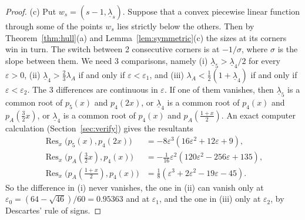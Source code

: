 \begin{proof}
(c) Put $w_s=(s-1,\underline\lambda_s)$. Suppose that a convex piecewise
linear function through some of the points $w_s$ lies strictly below the
others. Then by Theorem~\ref{thm:hull}(a) and Lemma~\ref{lem:symmetric}(c) the
sizes at its corners win in turn. The switch between 2 consecutive corners is
at $-1/\sigma$, where $\sigma$ is the slope between them. We need 3
comparisons, namely (i) $\underline\lambda_5>\underline\lambda_4/2$ for every
$\varepsilon>0$, (ii) $\underline\lambda_4>\frac23\lambda_A$ if and only if
$\varepsilon<\varepsilon_1$, and (iii)
$\lambda_A<\frac12(1+\underline\lambda_4)$ if and only if
$\varepsilon<\varepsilon_2$. The 3 differences are continuous in
$\varepsilon$. If one of them vanishes, then $\underline\lambda_5$ is a common
root of $p_5(x)$ and $p_4(2x)$, or $\underline\lambda_4$ is a common root of
$p_4(x)$ and $p_A(\frac32x)$, or $\underline\lambda_4$ is a common root of
$p_4(x)$ and $p_A(\frac{1+x}2)$. An exact computer calculation
(Section~\ref{sec:verify}) gives the resultants
\begin{align*}
\operatorname{Res}_x\bigl(p_5(x),p_4(2x)\bigr)&=-8\varepsilon^3(16\varepsilon^2+12\varepsilon+9),\\
\operatorname{Res}_x\bigl(p_A(\tfrac32x),p_4(x)\bigr)&=-\tfrac1{16}\varepsilon^2(120\varepsilon^2-256\varepsilon+135),\\
\operatorname{Res}_x\bigl(p_A(\tfrac{1+x}2),p_4(x)\bigr)&=\tfrac18(\varepsilon^3+2\varepsilon^2-19\varepsilon-45).
\end{align*}
So the difference in (i) never vanishes, the one in (ii) can vanish only at
$\varepsilon_0=(64-\sqrt{46})/60=0.95363$ and at $\varepsilon_1$, and the one in
(iii) only at $\varepsilon_2$, by Descartes' rule of signs.


\end{proof}
